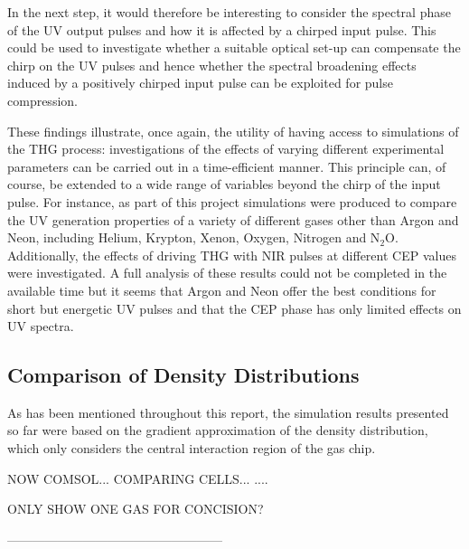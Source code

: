 \documentclass[a4paper]{jpconf}
\begin{document}
In the next step, it would therefore be interesting to consider the spectral phase of the UV output pulses and how it is affected by a chirped input pulse. This could be used to investigate whether a suitable optical set-up can compensate the chirp on the UV pulses and hence whether the spectral broadening effects  induced by a positively chirped input pulse can be exploited for pulse compression. \par 
These findings illustrate, once again, the utility of having access to simulations of the THG process:   
investigations of the effects of varying different experimental parameters can be carried out in a time-efficient manner. This principle can, of course, be extended to a wide range of variables beyond the chirp of the input pulse. For instance, as part of this project simulations were produced to compare the UV generation properties of a variety of different gases other than Argon and Neon, including Helium, Krypton, Xenon, Oxygen, Nitrogen and N$_2$O. Additionally, the effects of driving THG with NIR pulses at different CEP values were investigated. A full analysis of these results could not be completed in the available time but it seems that Argon and Neon offer the best conditions for short but energetic UV pulses and that the CEP phase has only limited effects on UV spectra. 

\subsection{Comparison of Density Distributions}
As has been mentioned throughout this report, the simulation results presented so far were based on the gradient approximation of the density distribution, which only considers the central interaction region of the gas chip. 



NOW COMSOL... 
COMPARING CELLS...
....

ONLY SHOW ONE GAS FOR CONCISION?

---------------------------------------------------
\end{document}
